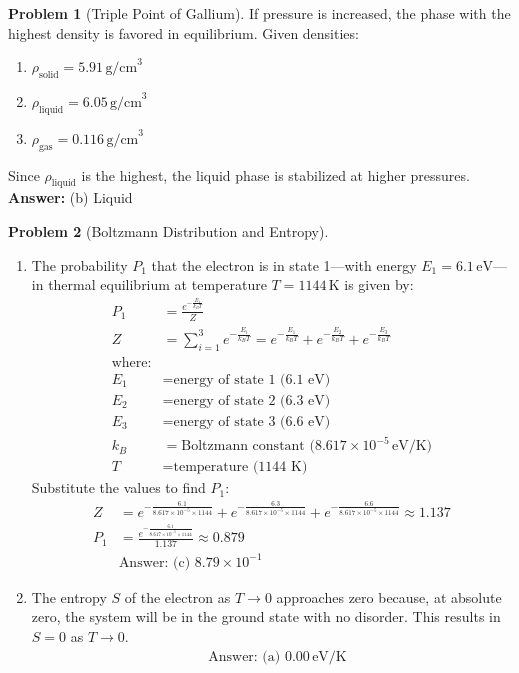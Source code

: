 \documentclass[12pt]{article}
\theoremstyle{definition} %
\newtheorem{problem}{Problem}
\theoremstyle{plain} %
\begin{document}
\begin{problem}[Triple Point of Gallium]
    \noindent
        If pressure is increased, the phase with the highest density is favored in equilibrium. Given densities:
        \begin{enumerate}
            \item $\rho_{\text{solid}} = 5.91 \, \text{g/cm}^3$
            \item $\rho_{\text{liquid}} = 6.05 \, \text{g/cm}^3$
            \item $\rho_{\text{gas}} = 0.116 \, \text{g/cm}^3$
        \end{enumerate}
        Since $\rho_{\text{liquid}}$ is the highest, the liquid phase is stabilized at higher pressures.
        \textbf{Answer:} (b) Liquid
\end{problem}
\begin{problem}[Boltzmann Distribution and Entropy]
    \noindent
    \begin{enumerate}
        \item 
        The probability \( P_1 \) that the electron is in state 1—with energy \( E_1 = 6.1 \, \text{eV} \)—in thermal equilibrium at temperature \( T = 1144 \, \text{K} \) is given by:
        \begin{align*}
        P_1 &= \frac{e^{-\frac{E_1}{k_B T}}}{Z} \\
        Z &= \sum_{i=1}^{3} e^{-\frac{E_i}{k_B T}} = e^{-\frac{E_1}{k_B T}} + e^{-\frac{E_2}{k_B T}} + e^{-\frac{E_3}{k_B T}} \\
        \text{where:} \\
        E_1 &= \text{energy of state 1 (6.1 eV)} \\
        E_2 &= \text{energy of state 2 (6.3 eV)} \\
        E_3 &= \text{energy of state 3 (6.6 eV)} \\
        k_B &= \text{Boltzmann constant (} 8.617 \times 10^{-5} \, \text{eV/K)} \\
        T &= \text{temperature (1144 K)}
        \end{align*}
        Substitute the values to find \( P_1 \):
        \begin{align*}
        Z &= e^{-\frac{6.1}{8.617 \times 10^{-5} \times 1144}} + e^{-\frac{6.3}{8.617 \times 10^{-5} \times 1144}} + e^{-\frac{6.6}{8.617 \times 10^{-5} \times 1144}} \approx 1.137 \\
        P_1 &= \frac{e^{-\frac{6.1}{8.617 \times 10^{-5} \times 1144}}}{1.137} \approx 0.879 \\
        &\text{Answer: (c) } 8.79 \times 10^{-1}
        \end{align*}

        \item 
        The entropy \( S \) of the electron as \( T \to 0 \) approaches zero because, at absolute zero, the system will be in the ground state with no disorder. This results in \( S = 0 \) as \( T \to 0 \).
        \begin{align*}
        &\text{Answer: (a) } 0.00 \, \text{eV/K}
        \end{align*}
    \end{enumerate}
\end{problem}
\end{document}
